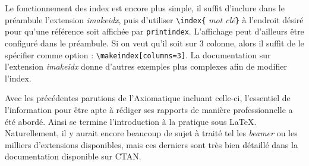 \par Le fonctionnement des index est encore plus simple, il suffit d'inclure dans le préambule l'extension \textit{imakeidx}, puis d'utiliser \verb|\index{| \textit{mot clé}\verb|}| à l'endroit désiré pour qu'une référence soit affichée par \verb|printindex|. L'affichage peut d'ailleurs être configuré dans le préambule. Si on veut qu'il soit sur 3 colonne, alors il suffit de le spécifier comme option : \verb|\makeindex[columns=3]|. La documentation\footnotemark{} sur l'extension \textit{imakeidx} donne d'autres exemples plus complexes afin de modifier l'index.

\par Avec les précédentes parutions de l'Axiomatique incluant celle-ci, l'essentiel de l'information pour être apte à rédiger ses rapports de manière professionnelle a été abordé. Ainsi se termine l'introduction à la pratique sous \LaTeX. Naturellement, il y aurait encore beaucoup de sujet à traité tel les \textit{beamer} ou les milliers d'extensions disponibles, mais ces derniers sont très bien détaillé dans la documentation disponible sur CTAN. 




